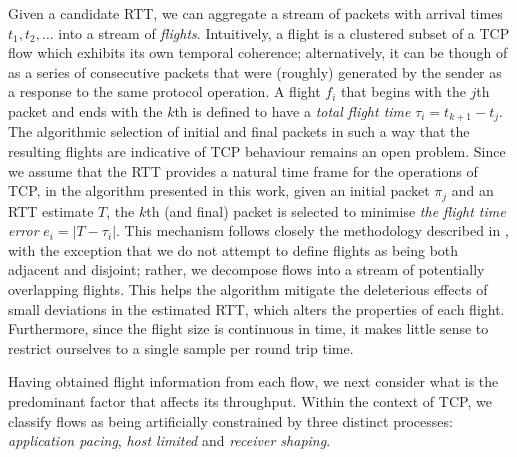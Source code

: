 Given a candidate RTT, we can aggregate a stream of packets with arrival times $t_1, t_2, \ldots$ into a stream of \emph{flights}. Intuitively, a flight is a clustered subset of a TCP flow which exhibits its own temporal coherence; alternatively, it can be though of as a series of consecutive packets that were (roughly) generated by the sender as a response to the same protocol operation. A flight $f_i$ that begins
with the $j$th packet and ends with the $k$th is defined to have a \emph{total flight time} $\tau_i = t_{k+1} - t_j$. 
The algorithmic selection of initial and final packets in such a way that the resulting flights are indicative of TCP behaviour remains an open problem. Since we assume that the RTT provides a natural time frame for the operations of TCP, in the algorithm presented in this work, given an initial packet $\pi_j$ and an RTT estimate $T$, the $k$th (and final) packet is selected to minimise \emph{the flight time error} $e_i = |T - \tau_i|$. 
This mechanism follows closely the methodology described in \cite{Zhang:2002p85}, with the exception that we do not attempt to define flights as being both adjacent and disjoint; rather, we decompose flows into a stream of potentially overlapping flights. 
This helps the algorithm mitigate the deleterious effects of small deviations in the estimated RTT, which alters the properties of each flight. 
Furthermore, since the flight size is continuous in time, it makes little sense to restrict ourselves to a single sample per round trip time.

Having obtained flight information from each flow, we next consider what is the predominant factor that affects its throughput. 
Within the context of TCP, we classify flows as being artificially constrained by three distinct processes: \emph{application pacing}, \emph{host limited} and \emph{receiver shaping}.

